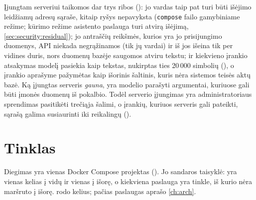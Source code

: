 Įjungtam serveriui taikomos dar trys ribos (): jo vardas taip pat turi būti
išėjimo leidžiamų adresų sąraše, kitaip ryšys nepavyksta (\texttt{compose} failo gamybiniame
režime; kūrimo režime asistento paslauga turi atvirą išėjimą, \cref{sec:security:residual});
jo antraščių reikšmės, kurios yra jo prisijungimo duomenys, API niekada negrąžinamos (tik jų
vardai) ir iš jos išeina tik per vidines duris, nors duomenų bazėje saugomos atviru tekstu; ir
kiekvieno įrankio atsakymas modelį pasiekia kaip tekstas, nukirptas ties 20\,000 simbolių
(), o įrankio aprašyme pažymėtas kaip išorinis šaltinis, kuris nėra
sistemos teisės aktų bazė. Ką įjungtas serveris \emph{gauna}, yra modelio parašyti
argumentai, kuriuose gali būti įmonės duomenų iš pokalbio. Todėl serverio įjungimas yra
administratoriaus sprendimas pasitikėti trečiąja šalimi, o įrankių, kuriuos serveris gali
pateikti, sąrašą galima susiaurinti iki reikalingų ().


\section{Tinklas}\label{sec:security:network}

Diegimas yra vienas Docker Compose projektas (). Jo sandaros
taisyklė: yra vienas kelias į vidų ir vienas į išorę, o kiekviena paslauga yra tinkle, iš
kurio nėra maršruto į išorę.  rodo kelius; pačias paslaugas
aprašo \cref{ch:arch}.

